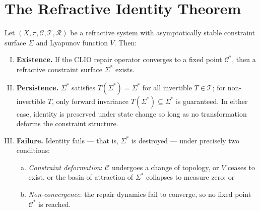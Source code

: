 \documentclass[11pt,openany]{book}
\begin{document}
\section{The Refractive Identity Theorem}
\label{sec:theorem}

\begin{theorem}
\label{thm:refractive-identity}
Let $(X, \pi, \mathcal{C}, \mathcal{T}, \mathcal{R})$ be a
refractive system with asymptotically stable constraint
surface $\Sigma$ and Lyapunov function $V$.  Then:
\begin{enumerate}[(I)]
  \item \textbf{Existence.}\; If the CLIO repair operator
    converges to a fixed point $\mathcal{C}^*$, then a
    refractive constraint surface $\Sigma^*$ exists.

  \item \textbf{Persistence.}\; $\Sigma^*$ satisfies
    $T(\Sigma^*) = \Sigma^*$ for all invertible
    $T \in \mathcal{T}$; for non-invertible $T$, only
    forward invariance $T(\Sigma^*) \subseteq \Sigma^*$ is
    guaranteed.  In either case, identity is preserved under
    state change so long as no transformation deforms the
    constraint structure.

  \item \textbf{Failure.}\; Identity fails --- that is,
    $\Sigma^*$ is destroyed --- under precisely two
    conditions:
    \begin{enumerate}[(a)]
      \item \emph{Constraint deformation}: $\mathcal{C}$
        undergoes a change of topology, or $V$ ceases to
        exist, or the basin of attraction of $\Sigma^*$
        collapses to measure zero; or
      \item \emph{Non-convergence}: the repair dynamics
        fail to converge, so no fixed point $\mathcal{C}^*$
        is reached.
    \end{enumerate}
\end{enumerate}
\end{theorem}
\end{document}
